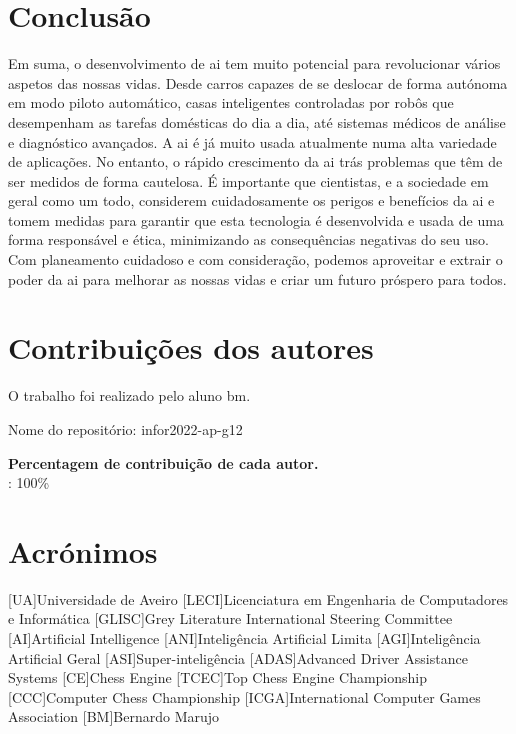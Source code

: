 \documentclass{report}
\begin{document}
\chapter{Conclusão}
\label{chap.conclusao}
Em suma, o desenvolvimento de \ac{ai} tem muito potencial para revolucionar vários aspetos das nossas vidas. Desde carros capazes de se deslocar de forma autónoma em modo piloto automático, casas inteligentes controladas por robôs que desempenham as tarefas domésticas do dia a dia, até sistemas médicos de análise e diagnóstico avançados. A \ac{ai} é já muito usada atualmente numa alta variedade de aplicações. No entanto, o rápido crescimento da \ac{ai} trás problemas que têm de ser medidos de forma cautelosa. É importante que cientistas, e a sociedade em geral como um todo, considerem cuidadosamente os perigos e benefícios da \ac{ai} e tomem medidas para garantir que esta tecnologia é desenvolvida e usada de uma forma responsável e ética, minimizando as consequências negativas do seu uso. Com planeamento cuidadoso e com consideração, podemos aproveitar e extrair o poder da \ac{ai} para melhorar as nossas vidas e criar um futuro próspero para todos.
\chapter*{Contribuições dos autores}
O trabalho foi realizado pelo aluno \ac{bm}.


Nome do repositório: infor2022-ap-g12

\vspace{10pt}
\textbf{Percentagem de contribuição de cada autor.}\\

\autores : 100\%
\chapter*{Acrónimos}
\begin{acronym}
[UA]{Universidade de Aveiro}
[LECI]{Licenciatura em Engenharia de Computadores e Informática}
[GLISC]{Grey Literature International Steering Committee}
[AI]{Artificial Intelligence}
[ANI]{Inteligência Artificial Limita}
[AGI]{Inteligência Artificial Geral}
[ASI]{Super-inteligência}
[ADAS]{Advanced Driver Assistance Systems}
[CE]{Chess Engine}
[TCEC]{Top Chess Engine Championship}
[CCC]{Computer Chess Championship}
[ICGA]{International Computer Games Association}
[BM]{Bernardo Marujo}
\end{acronym}


\printbibliography
\end{document}
